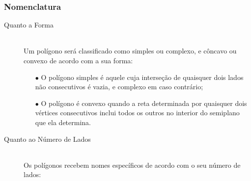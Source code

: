     \subsubsection{Nomenclatura}
        \begin{description}
            \item[Quanto a Forma] \hfill \\
                Um polígono será classificado como simples ou complexo, e côncavo ou convexo de acordo com a sua forma:
                \begin{itemize}
                    \item[$\bullet$] O polígono simples é aquele cuja interseção de quaisquer dois lados não consecutivos é vazia, e complexo em caso contrário;
                    \item[$\bullet$] O polígono é convexo quando a reta determinada por quaisquer dois vértices consecutivos inclui todos os outros no interior do semiplano que ela determina.
                \end{itemize} 
            \item[Quanto ao Número de Lados] \hfill \\
                Os polígonos recebem nomes específicos de acordo com o seu número de lados:
                \begin{enumerate}[start=3]
\end{enumerate}
\end{description}
